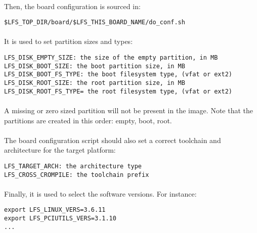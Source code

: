 \documentclass[a4paper, 11pt]{article}
\begin{document}
\paragraph{}
Then, the board configuration is sourced in:\\

\begin{lstlisting}[frame=tb]
$LFS_TOP_DIR/board/$LFS_THIS_BOARD_NAME/do_conf.sh
\end{lstlisting}

\paragraph{}
It is used to set partition sizes and types:\\

\begin{lstlisting}[frame=tb]
LFS_DISK_EMPTY_SIZE: the size of the empty partition, in MB
LFS_DISK_BOOT_SIZE: the boot partition size, in MB
LFS_DISK_BOOT_FS_TYPE: the boot filesystem type, (vfat or ext2)
LFS_DISK_ROOT_SIZE: the root partition size, in MB
LFS_DISK_ROOT_FS_TYPE= the root filesystem type, (vfat or ext2)
\end{lstlisting}

\paragraph{}
A missing or zero sized partition will not be present in the image. Note that
the partitions are created in this order: empty, boot, root.

\paragraph{}
The board configuration script should also set a correct toolchain and
architecture for the target platform:\\

\begin{lstlisting}[frame=tb]
LFS_TARGET_ARCH: the architecture type
LFS_CROSS_CROMPILE: the toolchain prefix
\end{lstlisting}

\paragraph{}
Finally, it is used to select the software versions. For instance:\\
\begin{lstlisting}[frame=tb]
export LFS_LINUX_VERS=3.6.11
export LFS_PCIUTILS_VERS=3.1.10
...
\end{lstlisting}
\end{document}
